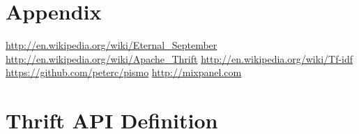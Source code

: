 \documentclass[11pt,letterpaper]{article}
\begin{document}
\section{Appendix}

\newpage
\newpage
\begin{thebibliography}{6}
   \url{http://en.wikipedia.org/wiki/Eternal\_September}
   \url{http://en.wikipedia.org/wiki/Apache\_Thrift}
   \url{http://en.wikipedia.org/wiki/Tf-idf}
   \url{https://github.com/peterc/pismo}
   \url{http://mixpanel.com}
\end{thebibliography}

\newpage
\appendix
\section{Thrift API Definition}
\label{app:thrift}
\end{document}
